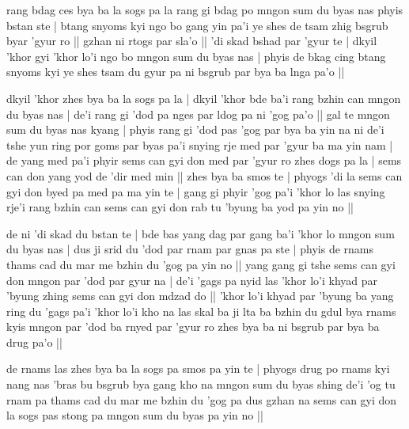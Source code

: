 \documentclass[11pt,twoside]{article}\makeatletter
\begin{document}
\par
\label{TV12}rang bdag ces bya ba la sogs pa la rang gi bdag po mngon sum du byas nas phyis bstan ste | btang snyoms kyi ngo bo gang yin pa'i ye shes de tsam zhig bsgrub byar 'gyur ro || gzhan ni rtogs par sla'o || 'di skad bshad par 'gyur te | dkyil 'khor gyi 'khor lo'i ngo bo mngon sum du byas nas | phyis de bkag cing btang snyoms kyi ye shes tsam du gyur pa ni bsgrub par bya ba lnga pa'o || 
\par
\label{TV13.1}dkyil 'khor zhes bya ba la sogs pa la | dkyil 'khor bde ba'i rang bzhin can mngon du byas nas | de'i rang gi 'dod pa nges par ldog pa ni 'gog pa'o || gal te mngon sum du byas nas kyang | phyis rang gi 'dod pas 'gog par bya ba yin na ni de'i tshe yun ring por goms par byas pa'i snying rje med par 'gyur ba ma yin nam | de yang med pa'i phyir sems can gyi don med par 'gyur ro zhes dogs pa la | sems can don yang yod de 'dir med min || zhes bya ba smos te | phyogs 'di la sems can gyi don byed pa med pa ma yin te | gang gi phyir 'gog pa'i 'khor lo las snying rje'i rang bzhin can sems can gyi don rab tu 'byung ba yod pa yin no || \par
\label{TV13.2}de ni 'di skad du bstan te | bde bas yang dag par gang ba'i 'khor lo mngon sum du byas nas | dus ji srid du 'dod par rnam par gnas pa ste | phyis de rnams thams cad du mar me bzhin du 'gog pa yin no || yang gang gi tshe sems can gyi don mngon par 'dod par gyur na | de'i 'gags pa nyid las 'khor lo'i khyad par 'byung zhing sems can  gyi don mdzad do || 'khor lo'i khyad par 'byung ba yang ring du 'gags pa'i 'khor lo'i kho na las skal ba ji lta ba bzhin du gdul bya rnams kyis mngon par 'dod ba rnyed par 'gyur ro zhes bya ba ni bsgrub par bya ba drug pa'o ||
\par
\label{TV14.1}de rnams las zhes bya ba la sogs pa smos pa yin te | phyogs drug po rnams kyi nang nas 'bras bu bsgrub bya gang kho na mngon sum du byas shing de'i 'og tu rnam pa thams cad du mar me bzhin du 'gog pa dus gzhan na sems can gyi don la sogs pas stong pa mngon sum du byas pa yin no || \par
\end{document}
